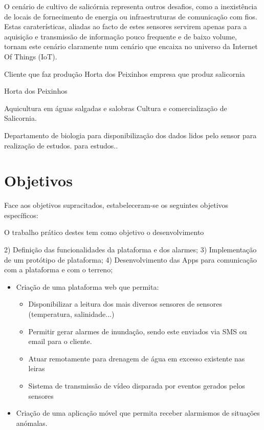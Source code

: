 O cenário de cultivo de salicórnia representa outros desafios, como a inexistência de
locais de fornecimento de energia ou infraestruturas de comunicação com fios. Estas 
caraterísticas, aliadas ao facto de estes sensores servirem apenas para a aquisição e transmissão
de informação pouco frequente e de baixo volume, tornam este cenário claramente num
cenário que encaixa no universo da Internet Of Things (IoT).



Cliente que faz produção 
Horta dos Peixinhos empresa que produz salicornia 

Horta dos Peixinhos

Aquicultura em águas salgadas e salobras
Cultura e comercialização de Salicornia.





Departamento de biologia para disponibilização dos dados lidos pelo sensor para realização de estudos. 
para estudos.. 





\section{Objetivos}


Face aos objetivos supracitados, estabeleceram-se os seguintes objetivos específicos:


O trabalho prático destes  tem como objetivo o desenvolvimento 


2) Definição das funcionalidades da plataforma e dos alarmes;
3) Implementação de um protótipo de plataforma;
4) Desenvolvimento das Apps para comunicação com a plataforma e com o terreno;


\begin{itemize}
    \item Criação de uma plataforma web que permita: 

    \begin{itemize}
        \item Disponibilizar a leitura dos mais diversos sensores de sensores (temperatura, salinidade...)
        
        \item Permitir gerar alarmes de inundação, sendo este enviados via SMS ou email para o cliente. 
        
        \item Atuar remotamente para drenagem de água em excesso existente nas leiras
        
        \item Sistema de transmissão de vídeo disparada por eventos gerados pelos sensores
        
        
    \end{itemize}
    
    \item Criação de uma aplicação móvel que permita receber alarmismos de situações anómalas. 
\end{itemize}


